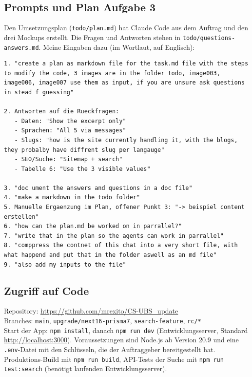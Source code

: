 \documentclass[11pt,a4paper]{article}
\let\oldsubsection\subsection
\renewcommand{\subsection}{\needspace{6\baselineskip}\oldsubsection}
\begin{document}
\subsection{Prompts und Plan Aufgabe 3}
Den Umsetzungsplan (\texttt{todo/plan.md}) hat Claude Code aus dem Auftrag und den drei Mockups erstellt. Die Fragen und Antworten stehen in \texttt{todo/questions-answers.md}. Meine Eingaben dazu (im Wortlaut, auf Englisch):
\begin{lstlisting}
1. "create a plan as markdown file for the task.md file with the steps to modify the code, 3 images are in the folder todo, image003, image006, image007 use them as input, if you are unsure ask questions in stead f guessing"

2. Antworten auf die Rueckfragen:
   - Daten: "Show the excerpt only"
   - Sprachen: "All 5 via messages"
   - Slugs: "how is the site currently handling it, with the blogs, they probalby have diffrent slug per langauge"
   - SEO/Suche: "Sitemap + search"
   - Tabelle 6: "Use the 3 visible values"

3. "doc ument the answers and questions in a doc file"
4. "make a markdown in the todo folder"
5. Manuelle Ergaenzung im Plan, offener Punkt 3: "-> beispiel content erstellen"
6. "how can the plan.md be worked on in parrallel?"
7. "write that in the plan so the agents can work in parrallel"
8. "comppress the contnet of this chat into a very short file, with what happend and put that in the folder aswell as an md file"
9. "also add my inputs to the file"
\end{lstlisting}

\subsection{Zugriff auf Code}
Repository: \url{https://github.com/mrexito/CS-UBS_update} \\
Branches: \texttt{main}, \texttt{upgrade/next16-prisma7}, \texttt{search-feature}, \texttt{rc/*} \\
Start der App: \texttt{npm install}, danach \texttt{npm run dev} (Entwicklungsserver, Standard \url{http://localhost:3000}). Voraussetzungen sind Node.js ab Version 20.9 und eine \texttt{.env}-Datei mit den Schlüsseln, die der Auftraggeber bereitgestellt hat. Produktions-Build mit \texttt{npm run build}, API-Tests der Suche mit \texttt{npm run test:search} (benötigt laufenden Entwicklungsserver).
\end{document}
